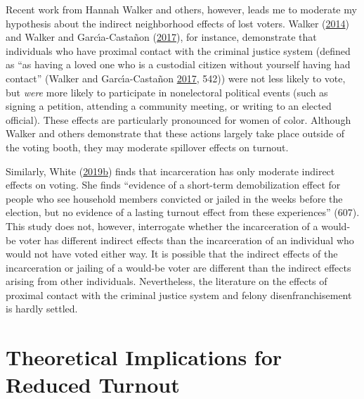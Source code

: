 \documentclass[12pt,]{article}
\begin{document}
Recent work from Hannah Walker and others, however, leads me to moderate my hypothesis about the indirect neighborhood effects of lost voters. Walker (\protect\hyperlink{ref-Walker2014}{2014}) and Walker and Garcı́a-Castañon (\protect\hyperlink{ref-Walker2017}{2017}), for instance, demonstrate that individuals who have proximal contact with the criminal justice system (defined as ``as having a loved one who is a custodial citizen without yourself having had contact'' (Walker and Garcı́a-Castañon \protect\hyperlink{ref-Walker2017}{2017}, 542)) were not less likely to vote, but \emph{were} more likely to participate in nonelectoral political events (such as signing a petition, attending a community meeting, or writing to an elected official). These effects are particularly pronounced for women of color. Although Walker and others demonstrate that these actions largely take place outside of the voting booth, they may moderate spillover effects on turnout.

Similarly, White (\protect\hyperlink{ref-White2019a}{2019}\protect\hyperlink{ref-White2019a}{b}) finds that incarceration has only moderate indirect effects on voting. She finds ``evidence of a short-term demobilization effect for people who see household members convicted or jailed in the weeks before the election, but no evidence of a lasting turnout effect from these experiences'' (607). This study does not, however, interrogate whether the incarceration of a would-be voter has different indirect effects than the incarceration of an individual who would not have voted either way. It is possible that the indirect effects of the incarceration or jailing of a would-be voter are different than the indirect effects arising from other individuals. Nevertheless, the literature on the effects of proximal contact with the criminal justice system and felony disenfranchisement is hardly settled.

\hypertarget{theoretical-implications-for-reduced-turnout}{%
\section*{Theoretical Implications for Reduced Turnout}\label{theoretical-implications-for-reduced-turnout}}
\end{document}
